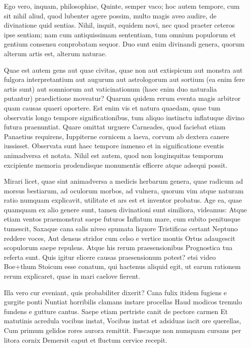  Ego vero, inquam, philosophiae, Quinte, semper vaco; hoc autem tempore, cum sit nihil aliud, quod lubenter agere possim, multo magis aveo audire, de divinatione quid sentias. Nihil, inquit, equidem novi, nec quod praeter ceteros ipse sentiam; nam cum antiquissimam sententiam, tum omnium populorum et gentium consensu conprobatam sequor. Duo sunt enim divinandi genera, quorum alterum artis est, alterum naturae.

 Quae est autem gens aut quae civitas, quae non aut extispicum aut monstra aut fulgora interpretantium aut augurum aut astrologorum aut sortium (ea enim fere artis sunt) aut somniorum aut vaticinationum (haec enim duo naturalia putantur) praedictione moveatur? Quarum quidem rerum eventa magis arbitror quam causas quaeri oportere. Est enim vis et natura quaedam, quae tum observatis longo tempore significationibus, tum aliquo instinctu inflatuque divino futura praenuntiat. Quare omittat urguere Carneades, quod faciebat etiam Panaetius requirens, Iuppiterne cornicem a laeva, corvum ab dextera canere iussisset. Observata sunt haec tempore inmenso et in significatione eventis animadversa et notata. Nihil est autem, quod non longinquitas temporum excipiente memoria prodendisque monumentis efficere atque adsequi possit.

 Mirari licet, quae sint animadversa a medicis herbarum genera, quae radicum ad morsus bestiarum, ad oculorum morbos, ad vulnera, quorum vim atque naturam ratio numquam explicavit, utilitate et ars est et inventor probatus. Age ea, quae quamquam ex alio genere sunt, tamen divinationi sunt similiora, videamus: Atque etiam ventos praemonstrat saepe futuros Inflatum mare, cum subito penitusque tumescit, Saxaque cana salis niveo spumata liquore Tristificas certant Neptuno reddere voces, Aut densus stridor cum celso e vertice montis Ortus adaugescit scopulorum saepe repulsus. Atque his rerum praesensionibus Prognostica tua referta sunt. Quis igitur elicere causas praesensionum potest? etsi video Boe+thum Stoicum esse conatum, qui hactenus aliquid egit, ut earum rationem rerum explicaret, quae in mari caelove fierent.

 Illa vero cur eveniant, quis probabiliter dixerit? Cana fulix itidem fugiens e gurgite ponti Nuntiat horribilis clamans instare procellas Haud modicos tremulo fundens e gutture cantus. Saepe etiam pertriste canit de pectore carmen Et matutinis acredula vocibus instat, Vocibus instat et adsiduas iacit ore querellas, Cum primum gelidos rores aurora remittit. Fuscaque non numquam cursans per litora cornix Demersit caput et fluctum cervice recepit.

